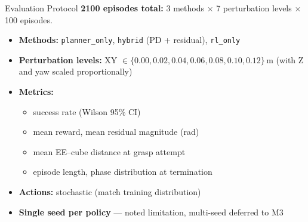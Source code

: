\documentclass[aspectratio=169, 10pt]{beamer}
\begin{document}
\begin{frame}{Evaluation Protocol}
  \textbf{2100 episodes total:} 3 methods $\times$ 7 perturbation levels $\times$ 100 episodes.

  \vspace{0.5em}
  \begin{itemize}
    \item \textbf{Methods:} \texttt{planner\_only}, \texttt{hybrid} (PD + residual), \texttt{rl\_only}
    \item \textbf{Perturbation levels:} XY $\in \{0.00, 0.02, 0.04, 0.06, 0.08, 0.10, 0.12\}$\,m
          (with Z and yaw scaled proportionally)
    \item \textbf{Metrics:}
          \begin{itemize}
            \item success rate (Wilson 95\% CI)
            \item mean reward, mean residual magnitude (rad)
            \item mean EE--cube distance at grasp attempt
            \item episode length, phase distribution at termination
          \end{itemize}
    \item \textbf{Actions:} stochastic (match training distribution)
    \item \textbf{Single seed per policy} --- noted limitation, multi-seed deferred to M3
  \end{itemize}
\end{frame}
\end{document}
